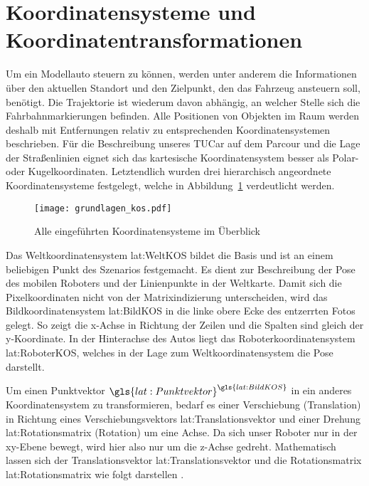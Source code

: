 \section{Koordinatensysteme und Koordinatentransformationen}

Um ein Modellauto steuern zu können, werden unter anderem die Informationen über den aktuellen Standort und den Zielpunkt, den das Fahrzeug ansteuern soll, benötigt. Die Trajektorie ist wiederum davon abhängig, an welcher Stelle sich die Fahrbahnmarkierungen befinden. Alle Positionen von Objekten im Raum werden deshalb mit Entfernungen relativ zu entsprechenden Koordinatensystemen beschrieben. Für die Beschreibung unseres TUCar auf dem Parcour und die Lage der Straßenlinien eignet sich das kartesische Koordinatensystem besser als Polar- oder Kugelkoordinaten. Letztendlich wurden drei hierarchisch angeordnete Koordinatensysteme festgelegt, welche in Abbildung~\ref{fig:grundlagen_kos} verdeutlicht werden. 

\begin{figure}[H] %
  \centering
  \texttt{[image: grundlagen\_kos.pdf]}
  \caption{Alle eingeführten Koordinatensysteme im Überblick}
  \label{fig:grundlagen_kos}
\end{figure}

Das Weltkoordinatensystem \gls{lat:WeltKOS} bildet die Basis und ist an einem beliebigen Punkt des Szenarios festgemacht. Es dient zur Beschreibung der Pose des mobilen Roboters und der Linienpunkte in der Weltkarte. Damit sich die Pixelkoordinaten nicht von der Matrixindizierung unterscheiden, wird das Bildkoordinatensystem \gls{lat:BildKOS} in die linke obere Ecke des entzerrten Fotos gelegt. So zeigt die x-Achse in Richtung der Zeilen und die Spalten sind gleich der y-Koordinate. In der Hinterachse des Autos liegt das Roboterkoordinatensystem \gls{lat:RoboterKOS}, welches in der Lage zum Weltkoordinatensystem die Pose darstellt.

Um einen Punktvektor \( \gls{lat:Punktvektor}^{\gls{lat:BildKOS}} \) in ein anderes Koordinatensystem zu transformieren, bedarf es einer Verschiebung (Translation) in Richtung eines Verschiebungsvektors \gls{lat:Translationsvektor} und einer Drehung \gls{lat:Rotationsmatrix} (Rotation) um eine Achse. Da sich unser Roboter nur in der xy-Ebene bewegt, wird hier also nur um die z-Achse gedreht.  
Mathematisch lassen sich der Translationsvektor \gls{lat:Translationsvektor} und die Rotationsmatrix \gls{lat:Rotationsmatrix} wie folgt darstellen \autocite{bajdRobotics2010}.

